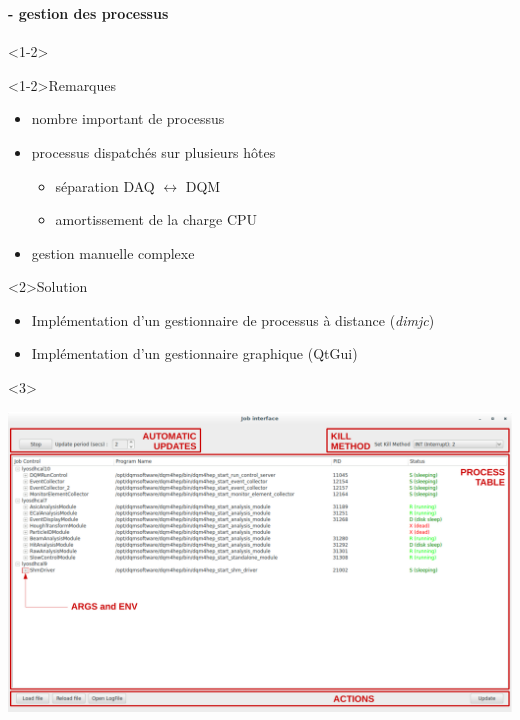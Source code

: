\documentclass[8pt]{beamer}
\begin{document}
  \begin{frame}
  \frametitle{\secname}
  \framesubtitle{\subsecname - gestion des processus}
    \begin{onlyenv}<1-2>
      \begin{block}<1-2>{Remarques}
        \begin{itemize}
          \item nombre important de processus
          \item processus dispatchés sur plusieurs hôtes
          \begin{itemize}
            \item séparation DAQ $\leftrightarrow$ DQM
            \item amortissement de la charge CPU
          \end{itemize}
          \item gestion manuelle complexe
        \end{itemize}
      \end{block}
      \begin{block}<2>{Solution}
        \begin{itemize}
          \item Implémentation d'un gestionnaire de processus à distance (\textit{dimjc})
          \item Implémentation d'un gestionnaire graphique (QtGui)
        \end{itemize}
      \end{block}
    \end{onlyenv}
    \begin{onlyenv}<3>
      \begin{center}
        \includegraphics[width=\linewidth]{JobControlGui.pdf}
      \end{center}
    \end{onlyenv}
  \end{frame}
\end{document}

